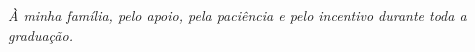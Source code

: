 \begin{dedicatoria}
\emph{À minha família, pelo apoio, pela paciência e pelo incentivo durante toda a graduação.}
\end{dedicatoria}
